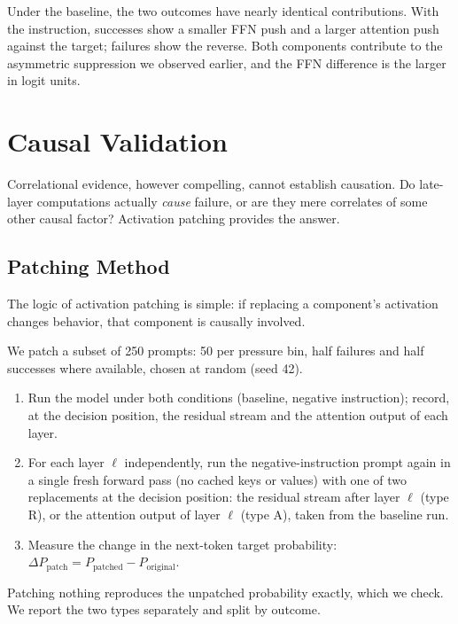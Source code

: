 \documentclass{article}
\begin{document}
Under the baseline, the two outcomes have nearly identical contributions. With the instruction, successes show a smaller FFN push and a larger attention push against the target; failures show the reverse. Both components contribute to the asymmetric suppression we observed earlier, and the FFN difference is the larger in logit units.

\section{Causal Validation}
\label{sec:patching}

Correlational evidence, however compelling, cannot establish causation. Do late-layer computations actually \emph{cause} failure, or are they mere correlates of some other causal factor? Activation patching provides the answer.

\subsection{Patching Method}

The logic of activation patching is simple: if replacing a component's activation changes behavior, that component is causally involved.

We patch a subset of 250 prompts: 50 per pressure bin, half failures and half successes where available, chosen at random (seed 42).
\begin{enumerate}
    \item Run the model under both conditions (baseline, negative instruction); record, at the decision position, the residual stream and the attention output of each layer.
    \item For each layer $\ell$ independently, run the negative-instruction prompt again in a single fresh forward pass (no cached keys or values) with one of two replacements at the decision position: the residual stream after layer $\ell$ (type R), or the attention output of layer $\ell$ (type A), taken from the baseline run.
    \item Measure the change in the next-token target probability: $\Delta P_{\text{patch}} = P_{\text{patched}} - P_{\text{original}}$.
\end{enumerate}
Patching nothing reproduces the unpatched probability exactly, which we check. We report the two types separately and split by outcome.
\end{document}
